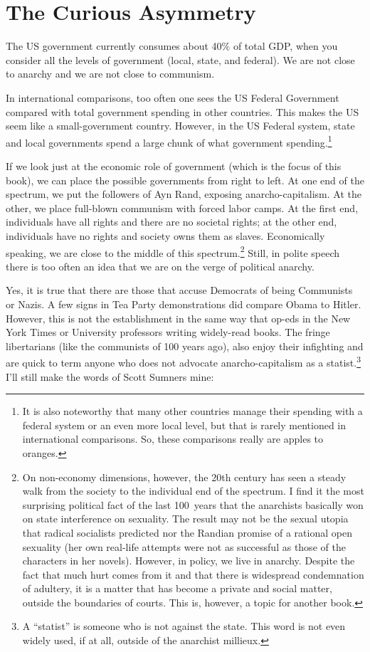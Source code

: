 \chapter{The Curious Asymmetry}

The US government currently consumes about 40\% of total GDP, when you consider
all the levels of government (local, state, and federal). We are not close to
anarchy and we are not close to communism.

In international comparisons, too often one sees the US Federal Government
compared with total government spending in other countries. This makes the US
seem like a small-government country. However, in the US Federal system, state
and local governments spend a large chunk of what government
spending.\footnote{It is also noteworthy that many other countries manage their
spending with a federal system or an even more local level, but that is rarely
mentioned in international comparisons.  So, these comparisons really are
apples to oranges.}

If we look just at the economic role of government (which is the focus of this
book), we can place the possible governments from right to left. At one end of
the spectrum, we put the followers of Ayn Rand, exposing anarcho-capitalism. At
the other, we place  full-blown communism with forced labor camps. At the first
end, individuals have all rights and there are no societal rights; at the other
end, individuals have no rights and society owns them as slaves.  Economically
speaking, we are close to the middle of this spectrum.\footnote{On non-economy
dimensions, however, the 20th century has seen a steady walk from the society
to the individual end of the spectrum. I find it the most surprising political
fact of the last 100~years that the anarchists basically won on state
interference on sexuality. The result may not be the sexual utopia that radical
socialists predicted nor the Randian promise of a rational open sexuality (her
own real-life attempts were not as successful as those of the characters in her
novels). However, in policy, we live in anarchy. Despite the
fact that much hurt comes from it and that there is widespread condemnation of
adultery, it is a matter that has become a private and social matter, outside
the boundaries of courts.  This is, however, a topic for another book.} Still,
in polite speech there is too often an idea that we are on the verge of
political anarchy.

Yes, it is true that there are those that accuse Democrats of being Communists
or Nazis. A few signs in Tea Party demonstrations did compare Obama to Hitler.
However, this is not the establishment in the same way that op-eds in the New
York Times or University professors writing widely-read books. The fringe
libertarians (like the communists of 100 years ago), also enjoy their
infighting and are quick to term anyone who does not advocate
anarcho-capitalism as a statist.\footnote{A ``statist'' is someone who is not
against the state. This word is not even widely used, if at all, outside of the
anarchist millieux.} I'll still make the words of Scott Sumners
mine:

